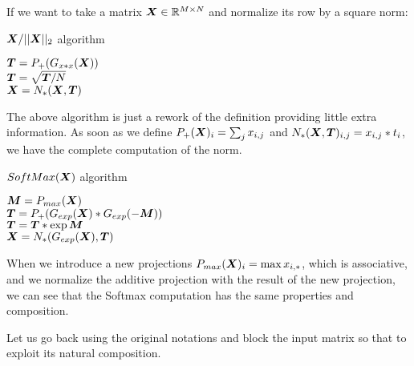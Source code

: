 \documentclass[acmsmall]{acmart}
\begin{document}
If we want to take a matrix ${\boldsymbol X} \in \mathbb{R}^{M\times N}$ and normalize
its row by a square norm:
\begin{algorithm}
    \caption{${\boldsymbol X}/||{\boldsymbol X}||_2$ algorithm}
    \label{alg:l2}
    \begin{algorithmic}
      \STATE ${\boldsymbol T} = P_+(G_{x*x}({\boldsymbol X}))$\\
      \STATE ${\boldsymbol T} = \sqrt{{\boldsymbol T}/N}$    \\
      \STATE ${\boldsymbol X} = N_*({\boldsymbol X},{\boldsymbol T})$ \\
    \end{algorithmic}
\end{algorithm}
The above algorithm is just a rework of the definition providing
little extra information.  As soon as we define $P_+({\boldsymbol X})_i =
\sum_j x_{i,j}$ and $N_*({\boldsymbol X}, {\boldsymbol T})_{i,j} = x_{i,j}*t_i$, we have
the complete computation of the norm.

\begin{algorithm}
    \caption{$SoftMax({\boldsymbol X})$ algorithm}
    \label{alg:l2_2}
    \begin{algorithmic}
      \STATE ${\boldsymbol M} = P_{max}({\boldsymbol X})$\\
      \STATE ${\boldsymbol T} = P_+(G_{exp}({\boldsymbol X})*G_{exp}(-{\boldsymbol M}))$\\
      \STATE ${\boldsymbol T} = {\boldsymbol T}*\exp{{\boldsymbol M}}$    \\
      \STATE ${\boldsymbol X} = N_*(G_{exp}({\boldsymbol X}),{\boldsymbol T})$ \\
    \end{algorithmic}
\end{algorithm}

When we introduce a new projections $P_{max}({\boldsymbol X})_i =
\max{x_{i,*}}$, which is associative, and we normalize the additive
projection with the result of the new projection, we can see that the
Softmax computation has the same properties and composition.

Let us go back using the original notations and block the input matrix
so that to exploit its natural composition.
\end{document}
